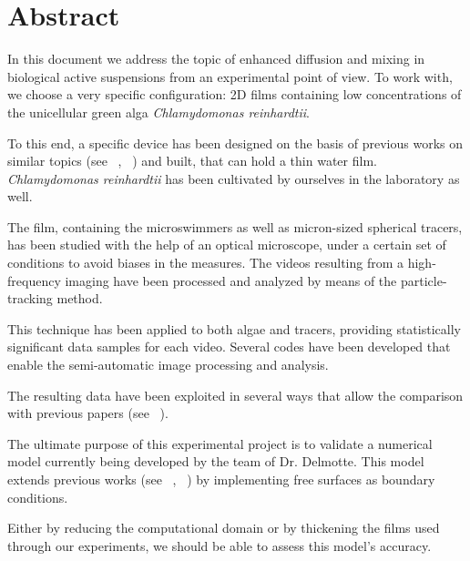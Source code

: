 \chapter*{Abstract}

In this document we address the topic of enhanced diffusion and mixing in biological active suspensions from an experimental point of view. To work with, we choose a very specific configuration: 2D films containing low concentrations of the unicellular green alga \textit{Chlamydomonas reinhardtii}.

To this end, a specific device has been designed on the basis of previous works on similar topics (see ~\cite{Sokolov2007}, ~\cite{Guasto}) and built, that can hold a thin water film. \textit{Chlamydomonas reinhardtii} has been cultivated by ourselves in the laboratory as well.

The film, containing the microswimmers as well as micron-sized spherical tracers, has been studied with the help of an optical microscope, under a certain set of conditions to avoid biases in the measures. The videos resulting from a high-frequency imaging have been processed and analyzed by means of the particle-tracking method. 

This technique has been applied to both algae and tracers, providing statistically significant data samples for each video. Several codes have been developed that enable the semi-automatic image processing and analysis.

The resulting data have been exploited in several ways that allow the comparison with previous papers (see ~\cite{Kurtuldu2011}). 

The ultimate purpose of this experimental project is to validate a numerical model currently being developed by the team of Dr. Delmotte. This model extends previous works (see ~\cite{Delmotte2015}, ~\cite{Delmotte2018}) by implementing free surfaces as boundary conditions.

Either by reducing the computational domain or by thickening the films used through our experiments, we should be able to assess this model's accuracy.
